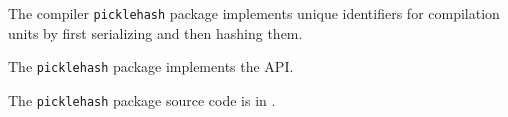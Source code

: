 
The compiler {\tt picklehash} package implements unique identifiers for 
compilation units by first serializing and then hashing them.

The {\tt picklehash} package implements the  API.

The {\tt picklehash} package source code is in .

